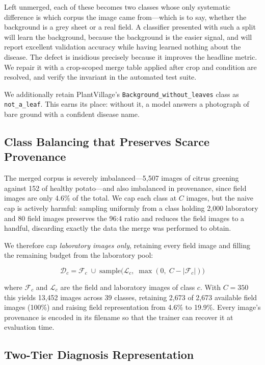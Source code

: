 \documentclass[conference]{IEEEtran}
\begin{document}
Left unmerged, each of these becomes two classes whose only systematic
difference is which corpus the image came from---which is to say, whether the
background is a grey sheet or a real field. A classifier presented with such a
split will learn the background, because the background is the easier signal,
and will report excellent validation accuracy while having learned nothing
about the disease. The defect is insidious precisely because it improves the
headline metric. We repair it with a crop-scoped merge table applied after
crop and condition are resolved, and verify the invariant in the automated
test suite.

We additionally retain PlantVillage's \texttt{Background\_without\_leaves} class
as \texttt{not\_a\_leaf}. This earns its place: without it, a model answers a
photograph of bare ground with a confident disease name.

\subsection{Class Balancing that Preserves Scarce Provenance}

The merged corpus is severely imbalanced---5{,}507 images of citrus greening
against 152 of healthy potato---and also imbalanced in provenance, since field
images are only 4.6\% of the total. We cap each class at $C$ images, but the
naive cap is actively harmful: sampling uniformly from a class holding 2{,}000
laboratory and 80 field images preserves the 96:4 ratio and reduces the field
images to a handful, discarding exactly the data the merge was performed to
obtain.

We therefore cap \emph{laboratory images only}, retaining every field image and
filling the remaining budget from the laboratory pool:

\begin{equation}
\mathcal{D}_c = \mathcal{F}_c \;\cup\; \text{sample}\big(\mathcal{L}_c,\;
\max(0,\; C - |\mathcal{F}_c|)\big)
\end{equation}

where $\mathcal{F}_c$ and $\mathcal{L}_c$ are the field and laboratory images of
class $c$. With $C=350$ this yields 13{,}452 images across 39 classes,
retaining 2{,}673 of 2{,}673 available field images (100\%) and raising field
representation from 4.6\% to 19.9\%. Every image's provenance is encoded in its
filename so that the trainer can recover it at evaluation time.

\subsection{Two-Tier Diagnosis Representation}
\end{document}
